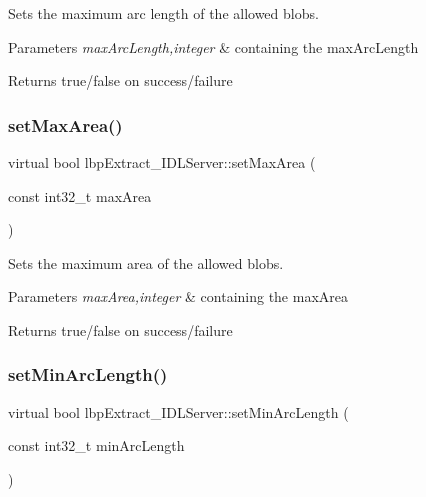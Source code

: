 Sets the maximum arc length of the allowed blobs. 


\begin{DoxyParams}{Parameters}
{\em max\+Arc\+Length,integer} & containing the max\+Arc\+Length \\
\hline
\end{DoxyParams}
\begin{DoxyReturn}{Returns}
true/false on success/failure 
\end{DoxyReturn}
\mbox{\label{classlbpExtract__IDLServer_a81dbd91a1460cdb450a7f7824e6d9953}} 
\subsubsection{\texorpdfstring{set\+Max\+Area()}{setMaxArea()}}
{\footnotesize\ttfamily virtual bool lbp\+Extract\+\_\+\+I\+D\+L\+Server\+::set\+Max\+Area (\begin{DoxyParamCaption}\item[{const int32\+\_\+t}]{max\+Area }\end{DoxyParamCaption})\hspace{0.3cm}{\ttfamily [virtual]}}



Sets the maximum area of the allowed blobs. 


\begin{DoxyParams}{Parameters}
{\em max\+Area,integer} & containing the max\+Area \\
\hline
\end{DoxyParams}
\begin{DoxyReturn}{Returns}
true/false on success/failure 
\end{DoxyReturn}
\mbox{\label{classlbpExtract__IDLServer_abd1ebed4459c05a4b849f8eebea14127}} 
\subsubsection{\texorpdfstring{set\+Min\+Arc\+Length()}{setMinArcLength()}}
{\footnotesize\ttfamily virtual bool lbp\+Extract\+\_\+\+I\+D\+L\+Server\+::set\+Min\+Arc\+Length (\begin{DoxyParamCaption}\item[{const int32\+\_\+t}]{min\+Arc\+Length }\end{DoxyParamCaption})\hspace{0.3cm}{\ttfamily [virtual]}}



